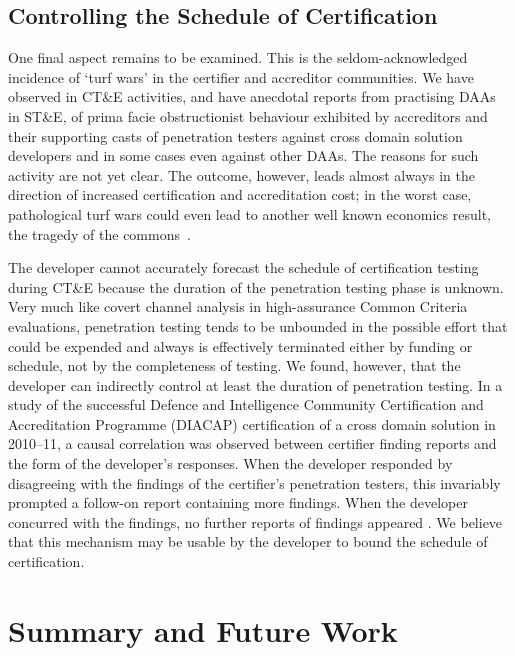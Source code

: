 \documentclass{llncs}
\begin{document}
\subsection{Controlling the Schedule of Certification}

One final aspect remains to be examined.  This is the seldom-acknowledged
incidence of `turf wars' in the certifier and accreditor communities.  We have
observed in CT\&E activities, and have anecdotal reports from
practising DAAs in ST\&E, of prima facie obstructionist behaviour exhibited
by accreditors and their supporting casts of penetration testers
against cross domain solution developers and in some cases even against other DAAs.
The reasons for such activity are not yet clear.  The outcome, however,
leads almost always in the direction of increased certification and accreditation cost; in
the worst case, pathological turf wars could even lead to another well known
economics result, the tragedy of the commons~\cite{Hardin1968}.

The developer cannot accurately forecast the schedule of certification testing
during CT\&E because the duration of the penetration testing phase is unknown.
Very much like covert channel analysis in high-assurance Common Criteria
evaluations, penetration testing tends to be unbounded in the possible effort
that could be expended and always is effectively terminated either by funding or
schedule, not by the completeness of testing.  We found, however, that the
developer can indirectly control at least
the duration of penetration testing.  In a study of the successful Defence and
Intelligence Community Certification and Accreditation Programme (DIACAP)
certification of a cross domain solution in 2010--11, a causal correlation was
observed between certifier finding reports and the form of the developer's
responses.  When the developer responded by disagreeing with the findings of
the certifier's penetration testers, this invariably prompted a follow-on report
containing more findings.  When the developer concurred with the findings, no
further reports of findings appeared \cite{Loughry2012b}.  We believe that this
mechanism may be usable by the developer to bound the schedule of certification.


\section{Summary and Future Work}
\end{document}
